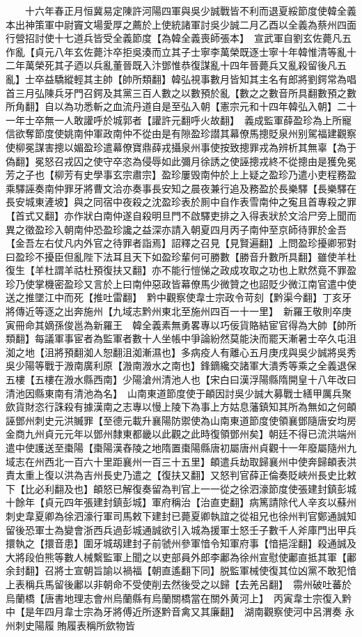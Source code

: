　　十六年春正月恒冀易定陳許河陽四軍與吳少誠戰皆不利而退夏綏節度使韓全義本出神策軍中尉竇文場愛厚之薦於上使統諸軍討吳少誠二月乙酉以全義為蔡州四面行營招討使十七道兵皆受全義節度【為韓全義喪師張本】　宣武軍自劉玄佐薨凡五作亂【貞元八年玄佐薨汴卒拒吳湊而立其子士寧李萬榮既逐士寧十年韓惟清等亂十二年萬榮死其子迺以兵亂董晉既入汴鄧惟恭復謀亂十四年晉薨兵又亂殺留後凡五亂】士卒益驕縱輕其主帥【帥所類翻】韓弘視事數月皆知其主名有郎將劉鍔常為唱首三月弘陳兵牙門召鍔及其黨三百人數之以數預於亂【數之之數音所具翻數預之數所角翻】自以為功悉斬之血流丹道自是至弘入朝【憲宗元和十四年韓弘入朝】二十一年士卒無一人敢讙呼於城郭者【讙許元翻呼火故翻】　義成監軍薛盈珍為上所寵信欲奪節度使姚南仲軍政南仲不從由是有隙盈珍譛其幕僚馬摠貶泉州别駕福建觀察使柳冕謀害摠以媚盈珍遣幕僚寶鼎薛戎攝泉州事使按致摠罪戎為辨析其無辜【為于偽翻】冕怒召戎囚之使守卒恣為侵辱如此彌月徐誘之使誣摠戎終不從摠由是獲免冕芳之子也【柳芳有史學事玄宗肅宗】盈珍屢毁南仲於上上疑之盈珍乃遣小吏程務盈乘驛誣奏南仲罪牙將曹文洽亦奏事長安知之晨夜兼行追及務盈於長樂驛【長樂驛在長安城東滻坡】與之同宿中夜殺之沈盈珍表於厠中自作表雪南仲之寃且首專殺之罪【首式又翻】亦作狀白南仲遂自殺明旦門不啟驛吏排之入得表狀於文洽尸旁上聞而異之徵盈珍入朝南仲恐盈珍讒之益深亦請入朝夏四月丙子南仲至京師待罪於金吾【金吾左右仗凡内外官之待罪者詣焉】詔釋之召見【見賢遍翻】上問盈珍擾卿邪對曰盈珍不擾臣但亂陛下法耳且天下如盈珍輩何可勝數【勝音升數所具翻】雖使羊杜復生【羊杜謂羊祜杜預復扶又翻】亦不能行愷悌之政成攻取之功也上默然竟不罪盈珍乃使掌機密盈珍又言於上曰南仲惡政皆幕僚馬少微贊之也詔貶少微江南官遣中使送之推墜江中而死【推吐雷翻】　黔中觀察使韋士宗政令苛刻【黔渠今翻】丁亥牙將傳近等逐之出奔施州【九域志黔州東北至施州四百一十一里】　新羅王敬則卒庚寅冊命其嫡孫俊邕為新羅王　韓全義素無勇畧專以巧佞貨賂結宦官得為大帥【帥所類翻】每議軍事宦者為監軍者數十人坐帳中爭論紛然莫能決而罷天漸暑士卒久屯沮洳之地【沮將預翻洳人恕翻沮洳漸濕也】多病疫人有離心五月庚戌與吳少誠將吳秀吳少陽等戰于溵南廣利原【溵南溵水之南也】鋒鏑纔交諸軍大潰秀等乘之全義退保五樓【五樓在溵水縣西南】少陽滄州清池人也【宋白曰漢浮陽縣隋開皇十八年改曰清池因縣東南有清池為名】　山南東道節度使于頔因討吳少誠大募戰士繕甲厲兵聚歛貨財恣行誅殺有據漢南之志專以慢上陵下為事上方姑息藩鎮知其所為無如之何頔誣鄧州刺史元洪贓罪【至德元載升襄陽防禦使為山南東道節度使領襄鄧隨唐安均房金商九州貞元元年以鄧州隸東都畿以此觀之此時復領鄧州矣】朝廷不得已流洪端州遣中使護送至棗陽【棗陽漢舂陵之地隋置棗陽縣唐初屬唐州貞觀十一年廢屬隨州九域志在州西北一百六十里距襄州一百三十五里】頔遣兵劫取歸襄州中使奔歸頔表洪責太重上復以洪為吉州長史乃遣之【復扶又翻】又怒判官薛正倫奏貶峽州長史比敕下【比必利翻及也】頔怒已解復奏留為判官上一一從之徐泗濠節度使張建封鎮彭城十餘年【貞元四年張建封鎮彭城】軍府稱治【治直吏翻】病篤請除代人辛亥以蘇州刺史韋夏卿為徐泗濠行軍司馬敕下建封已薨夏卿執誼之從祖兄也徐州判官鄭通誠知留後恐軍士為變會浙西兵過彭城通誠欲引入城為援軍士怒壬子數千人斧庫門出甲兵擐執之【擐音患】圍牙城刼建封子前虢州參軍愔令知軍府事【愔挹淫翻】殺通誠及大將段伯熊等數人械繫監軍上聞之以吏部員外郎李鄘為徐州宣慰使鄘直抵其軍【鄘余封翻】召將士宣朝旨諭以禍福【朝直遙翻下同】脱監軍械使復其位凶黨不敢犯愔上表稱兵馬留後鄘以非朝命不受使削去然後受之以歸【去羌呂翻】　霛州破吐蕃於烏蘭橋【唐書地理志會州烏蘭縣有烏蘭關橋當在關外黄河上】　丙寅韋士宗復入黔中【是年四月韋士宗為牙將傅近所逐黔音禽又其廉翻】　湖南觀察使河中呂渭奏永州刺史陽履賄履表稱所歛物皆